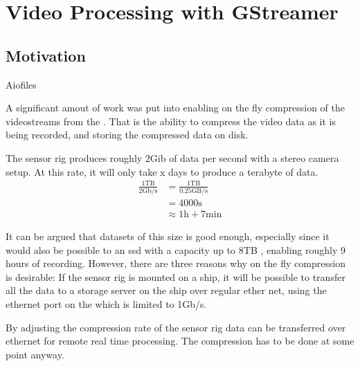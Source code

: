 \chapter{Video Processing with GStreamer}
\label{chap:gstreamer}

\section{Motivation}
Aiofiles

A significant amout of work was put into enabling on the fly compression of the videostreams from the \sr.
That is the ability to compress the video data as it is being recorded, and storing the compressed data on disk.

The sensor rig produces roughly 2Gib of data per second with a stereo camera setup.
At this rate, it will only take x days to produce a terabyte of data.
\begin{align}
    \frac{1\text{TB}}{2\text{Gb/s}} & = \frac{1\text{TB}}{0.25\text{GB/s}} \\
                                    & = 4000\text{s}                       \\
                                    & \approx 1\text{h} + 7\text{min}
\end{align}

It can be argued that datasets of this size is good enough, especially since it would also be possible to an \gls{ssd} with a capacity up to 8TB \cite{CorsairMP600PRO}, enabling roughly 9 hours of recording.
However, there are three reasons why on the fly compression is desirable:
If the sensor rig is mounted on a ship, it will be possible to transfer all the data to a storage server on the ship over regular ether net, using the ethernet port on the \jx which is limited to 1Gb/s.

By adjusting the compression rate of the sensor rig data can be transferred over ethernet for remote real time processing.
The compression has to be done at some point anyway.






